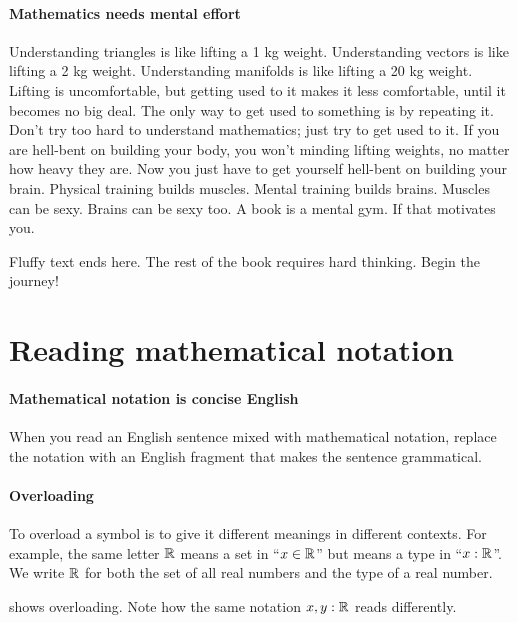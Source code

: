 \paragraph{Mathematics needs mental effort}

Understanding triangles is like lifting a 1 kg weight.
Understanding vectors is like lifting a 2 kg weight.
Understanding manifolds is like lifting a 20 kg weight.
Lifting is uncomfortable,
but getting used to it makes it less comfortable,
until it becomes no big deal.
The only way to get used to something is by repeating it.
Don't try too hard to understand mathematics; just try to get used to it.
If you are hell-bent on building your body,
you won't minding lifting weights, no matter how heavy they are.
Now you just have to get yourself hell-bent on building your brain.
Physical training builds muscles.
Mental training builds brains.
Muscles can be sexy.
Brains can be sexy too.
A book is a mental gym.
If that motivates you.

Fluffy text ends here.
The rest of the book requires hard thinking.
Begin the journey!

\section{Reading mathematical notation}

\paragraph{Mathematical notation is concise English}

When you read an English sentence mixed with mathematical notation,
replace the notation with an English fragment that makes the sentence grammatical.

%
\paragraph{Overloading}

To overload a symbol is to give it different meanings in different contexts.
For example, the same letter \(\mathbb{R}\) means a set in \enquote{\(x \in \mathbb{R}\)}
but means a type in \enquote{\(x : \mathbb{R}\)}.
We write \(\mathbb{R}\) for both the set of all real numbers and the type of a real number.

 shows overloading.
Note how the same notation \(x,y:\mathbb{R}\) reads differently.


